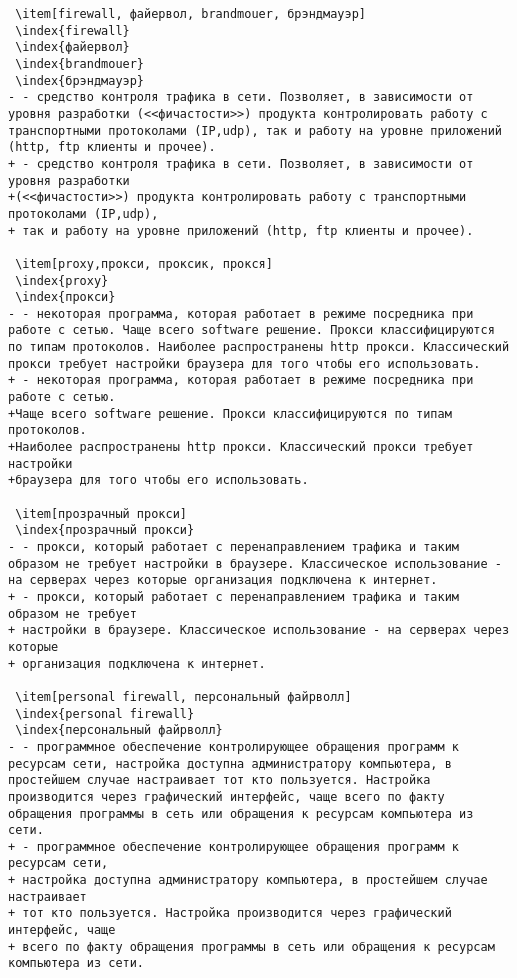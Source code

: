 \begin{verbatim}
 \item[firewall, файервол, brandmouer, брэндмауэр]
 \index{firewall}
 \index{файервол}
 \index{brandmouer}
 \index{брэндмауэр}
- - средство контроля трафика в сети. Позволяет, в зависимости от уровня разработки (<<фичастости>>) продукта контролировать работу с транспортными протоколами (IP,udp), так и работу на уровне приложений (http, ftp клиенты и прочее).
+ - средство контроля трафика в сети. Позволяет, в зависимости от уровня разработки
+(<<фичастости>>) продукта контролировать работу с транспортными протоколами (IP,udp),
+ так и работу на уровне приложений (http, ftp клиенты и прочее).

 \item[proxy,прокси, проксик, прокся]
 \index{proxy}
 \index{прокси}
- - некоторая программа, которая работает в режиме посредника при работе с сетью. Чаще всего software решение. Прокси классифицируются по типам протоколов. Наиболее распространены http прокси. Классический прокси требует настройки браузера для того чтобы его использовать.
+ - некоторая программа, которая работает в режиме посредника при работе с сетью.
+Чаще всего software решение. Прокси классифицируются по типам протоколов.
+Наиболее распространены http прокси. Классический прокси требует настройки
+браузера для того чтобы его использовать.

 \item[прозрачный прокси]
 \index{прозрачный прокси}
- - прокси, который работает с перенаправлением трафика и таким образом не требует настройки в браузере. Классическое использование - на серверах через которые организация подключена к интернет.
+ - прокси, который работает с перенаправлением трафика и таким образом не требует
+ настройки в браузере. Классическое использование - на серверах через которые
+ организация подключена к интернет.

 \item[personal firewall, персональный файрволл]
 \index{personal firewall}
 \index{персональный файрволл}
- - программное обеспечение контролирующее обращения программ к ресурсам сети, настройка доступна администратору компьютера, в простейшем случае настраивает тот кто пользуется. Настройка производится через графический интерфейс, чаще всего по факту обращения программы в сеть или обращения к ресурсам компьютера из сети.
+ - программное обеспечение контролирующее обращения программ к ресурсам сети,
+ настройка доступна администратору компьютера, в простейшем случае настраивает
+ тот кто пользуется. Настройка производится через графический интерфейс, чаще
+ всего по факту обращения программы в сеть или обращения к ресурсам компьютера из сети.


\end{verbatim}
